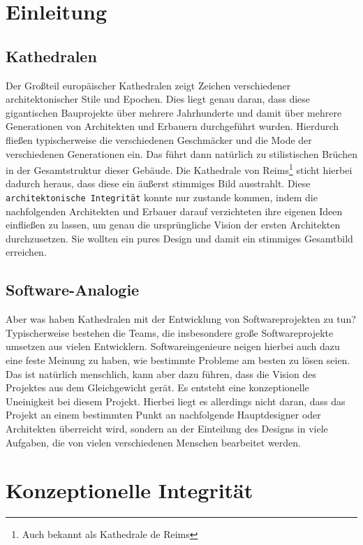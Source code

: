 \documentclass[a4paper, ngerman, 12pt, usenames, dvipsnames]{article}
\begin{document}
\tableofcontents
\thispagestyle{empty}
\pagebreak

\section{Einleitung}
\subsection{Kathedralen}
Der Großteil europäischer Kathedralen zeigt Zeichen verschiedener architektonischer Stile und Epochen.
Dies liegt genau daran, dass diese gigantischen Bauprojekte über mehrere Jahrhunderte und damit über mehrere Generationen von Architekten und Erbauern durchgeführt wurden.
Hierdurch fließen typischerweise die verschiedenen Geschmäcker und die Mode der verschiedenen Generationen ein.
Das führt dann natürlich zu stilistischen Brüchen in der Gesamtstruktur dieser Gebäude.
Die Kathedrale von Reims\footnote{Auch bekannt als Kathedrale de Reims} sticht hierbei dadurch heraus, dass diese ein äußerst stimmiges Bild ausstrahlt.
Diese \texttt{architektonische Integrität} konnte nur zustande kommen, indem die nachfolgenden Architekten und Erbauer darauf verzichteten ihre eigenen Ideen einfließen zu lassen, um genau die ursprüngliche Vision der ersten Architekten durchzusetzen. Sie wollten ein pures Design und damit ein stimmiges Gesamtbild erreichen.

\subsection{Software-Analogie}
Aber was haben Kathedralen mit der Entwicklung von Softwareprojekten zu tun? Typischerweise bestehen die Teams, die insbesondere große Softwareprojekte umsetzen aus vielen Entwicklern. Softwareingenieure neigen hierbei auch dazu eine feste Meinung zu haben, wie bestimmte Probleme am besten zu lösen seien. Das ist natürlich menschlich, kann aber dazu führen, dass die Vision des Projektes aus dem Gleichgewicht gerät. Es entsteht eine konzeptionelle Uneinigkeit bei diesem Projekt. Hierbei liegt es allerdings nicht daran, dass das Projekt an einem bestimmten Punkt an nachfolgende Hauptdesigner oder Architekten überreicht wird, sondern an der Einteilung des Designs in viele Aufgaben, die von vielen verschiedenen Menschen bearbeitet werden.

\pagebreak
\section{Konzeptionelle Integrität}
\end{document}
